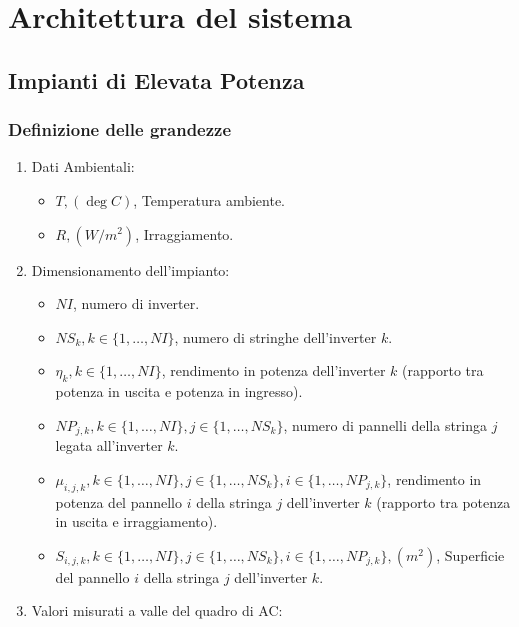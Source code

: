 \clearpage{\pagestyle{empty}\cleardoublepage}
\chapter{Architettura del sistema}

\section{Impianti di Elevata Potenza}

\subsection{Definizione delle grandezze}

\begin{enumerate}
\item Dati Ambientali:
\begin{itemize}
\item $T, (\deg C)$, Temperatura ambiente.
\item $R, (W/m^2)$, Irraggiamento.
\end{itemize}
\item Dimensionamento dell'impianto:
\begin{itemize}
\item $NI$, numero di inverter.
\item $NS_k, k \in \{1, \dots, NI\}$, numero di stringhe dell'inverter $k$.
\item $\eta _{k}, k \in \{1, \dots, NI\}$, rendimento in potenza
  dell'inverter $k$ (rapporto tra
  potenza in uscita e potenza in ingresso).
\item $NP_{j,k}, k \in \{1, \dots, NI\}, j \in \{1, \dots, NS_k\}$, numero
  di pannelli della stringa $j$ legata all'inverter $k$.
\item $\mu _{i,j,k}, k \in \{1, \dots, NI\}, j \in \{1, \dots, NS_k\}, i \in
  \{1, \dots, NP_{j,k}\}$, rendimento in potenza del pannello $i$ della stringa
  $j$ dell'inverter $k$ (rapporto tra  potenza in uscita e irraggiamento).
\item $S _{i,j,k}, k \in \{1, \dots, NI\}, j \in \{1, \dots, NS_k\}, i \in
  \{1, \dots, NP_{j,k}\}, (m^2)$, Superficie del pannello $i$ della stringa
  $j$ dell'inverter $k$.
\end{itemize}
\item Valori misurati a valle del quadro di AC:
\begin{itemize}

\end{itemize}
\end{enumerate}
